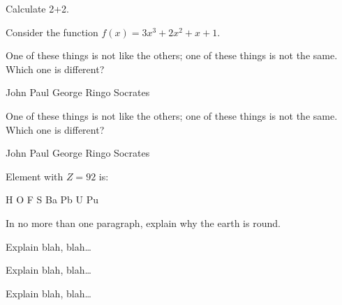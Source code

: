 \documentclass[12pt]{exam}
\begin{document}
\begin{questions}

\question[1] Calculate 2+2.
\addpoints

\question[20] Consider the function $f(x)=3x^3+2x^2+x+1$.
\noaddpoints %
\addpoints

\question[2] One of these things is not like the others; one of these
things is not the same. Which one is different?
\begin{choices}
\choice John
\choice Paul
\choice George
\choice Ringo
\choice Socrates
\end{choices}

\question[2] One of these things is not like the others; one of these
things is not the same. Which one is different?
\begin{oneparchoices}
\choice John
\choice Paul
\choice George
\choice Ringo
\choice Socrates
\end{oneparchoices}


{%
\renewcommand*\thechoice{\arabic{choice}} 
\renewcommand*\choicelabel{\thechoice)}
%
\question[2] Element with $Z=92$ is:
\begin{multicols}{2}
\begin{choices}
\choice H
\choice O
\choice F
\choice S
\choice Ba
\choice Pb
\choice U
\choice Pu
\end{choices}
\end{multicols}
}%

\question[10]
In no more than one paragraph, explain why the earth is round.

\question[20]
Explain blah, blah\ldots

\newpage

\question[20]
Explain blah, blah\ldots
\fillwithlines{\fill}

\newpage

\question[20]
Explain blah, blah\ldots
\fillwithdottedlines{8em}

\end{questions}
\end{document}
